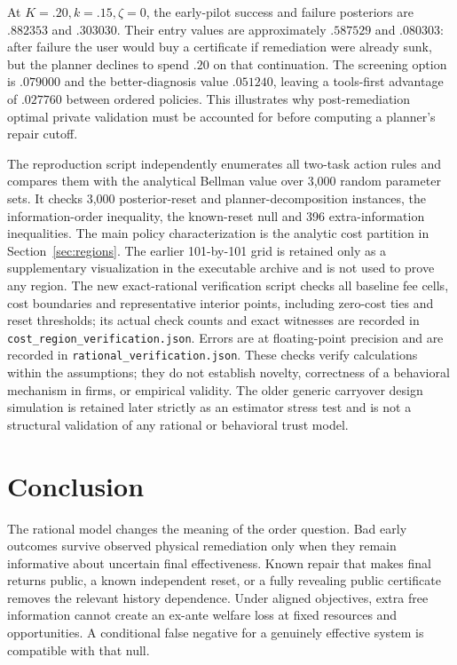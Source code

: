 \documentclass[11pt]{article}
\begin{document}
At $K=.20,k=.15,\zeta=0$, the early-pilot success and failure posteriors are $.882353$ and $.303030$. Their entry values are approximately $.587529$ and $.080303$: after failure the user would buy a certificate if remediation were already sunk, but the planner declines to spend $.20$ on that continuation. The screening option is $.079000$ and the better-diagnosis value $.051240$, leaving a tools-first advantage of $.027760$ between ordered policies. This illustrates why post-remediation optimal private validation must be accounted for before computing a planner's repair cutoff.

The reproduction script independently enumerates all two-task action rules and compares them with the analytical Bellman value over 3,000 random parameter sets. It checks 3,000 posterior-reset and planner-decomposition instances, the information-order inequality, the known-reset null and 396 extra-information inequalities. The main policy characterization is the analytic cost partition in Section~\ref{sec:regions}. The earlier 101-by-101 grid is retained only as a supplementary visualization in the executable archive and is not used to prove any region. The new exact-rational verification script checks all baseline fee cells, cost boundaries and representative interior points, including zero-cost ties and reset thresholds; its actual check counts and exact witnesses are recorded in \texttt{cost\_region\_verification.json}. Errors are at floating-point precision and are recorded in \texttt{rational\_verification.json}. These checks verify calculations within the assumptions; they do not establish novelty, correctness of a behavioral mechanism in firms, or empirical validity. The older generic carryover design simulation is retained later strictly as an estimator stress test and is not a structural validation of any rational or behavioral trust model.

\section{Conclusion}
The rational model changes the meaning of the order question. Bad early outcomes survive observed physical remediation only when they remain informative about uncertain final effectiveness. Known repair that makes final returns public, a known independent reset, or a fully revealing public certificate removes the relevant history dependence. Under aligned objectives, extra free information cannot create an ex-ante welfare loss at fixed resources and opportunities. A conditional false negative for a genuinely effective system is compatible with that null.
\end{document}
